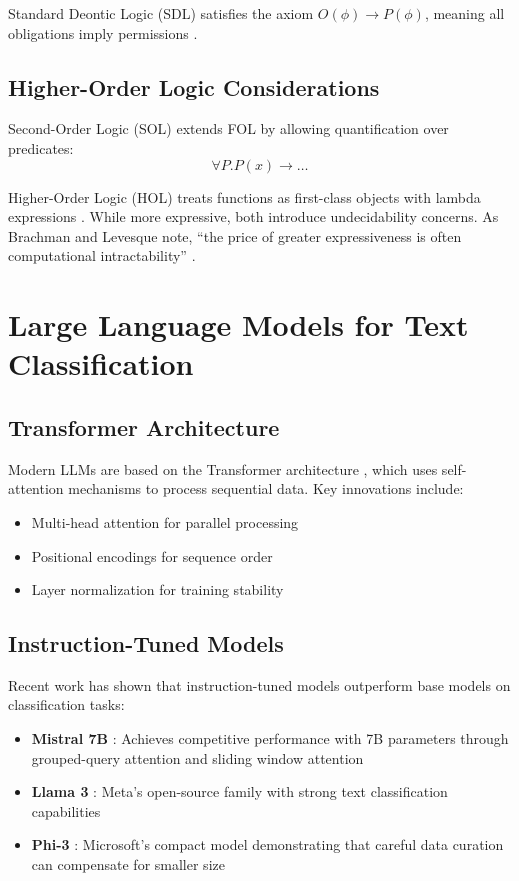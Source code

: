 Standard Deontic Logic (SDL) satisfies the axiom $O(\phi) \rightarrow P(\phi)$, meaning all obligations imply permissions \cite{mcnamara2006deontic}.

\subsection{Higher-Order Logic Considerations}

Second-Order Logic (SOL) extends FOL by allowing quantification over predicates:
$$\forall P. P(x) \rightarrow \ldots$$

Higher-Order Logic (HOL) treats functions as first-class objects with lambda expressions \cite{farmer2008seven}. While more expressive, both introduce undecidability concerns. As Brachman and Levesque note, ``the price of greater expressiveness is often computational intractability'' \cite{brachman2004knowledge}.

\section{Large Language Models for Text Classification}

\subsection{Transformer Architecture}

Modern LLMs are based on the Transformer architecture \cite{vaswani2017attention}, which uses self-attention mechanisms to process sequential data. Key innovations include:

\begin{itemize}
    \item Multi-head attention for parallel processing
    \item Positional encodings for sequence order
    \item Layer normalization for training stability
\end{itemize}

\subsection{Instruction-Tuned Models}

Recent work has shown that instruction-tuned models outperform base models on classification tasks:

\begin{itemize}
    \item \textbf{Mistral 7B} \cite{jiang2023mistral}: Achieves competitive performance with 7B parameters through grouped-query attention and sliding window attention
    \item \textbf{Llama 3} \cite{touvron2023llama}: Meta's open-source family with strong text classification capabilities
    \item \textbf{Phi-3} \cite{abdin2024phi}: Microsoft's compact model demonstrating that careful data curation can compensate for smaller size
\end{itemize}

